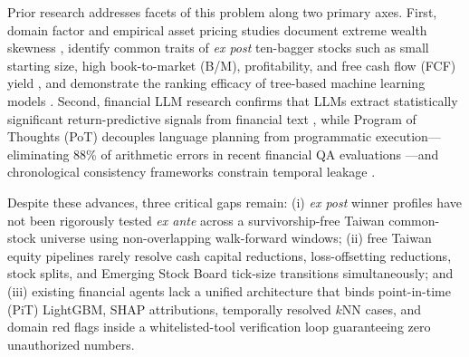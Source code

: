 \documentclass[conference]{IEEEtran}
\begin{document}
Prior research addresses facets of this problem along two primary axes. First, domain factor and empirical asset pricing studies document extreme wealth skewness \cite{bessembinder2023, bessembinder2026}, identify common traits of \emph{ex post} ten-bagger stocks such as small starting size, high book-to-market (B/M), profitability, and free cash flow (FCF) yield \cite{yartseva2025}, and demonstrate the ranking efficacy of tree-based machine learning models \cite{gu2020}. Second, financial LLM research confirms that LLMs extract statistically significant return-predictive signals from financial text \cite{lopezlira2026}, while Program of Thoughts (PoT) \cite{chen2023pot} decouples language planning from programmatic execution---eliminating 88\% of arithmetic errors in recent financial QA evaluations \cite{agenticrag2026}---and chronological consistency frameworks constrain temporal leakage \cite{he2025chrono}.

Despite these advances, three critical gaps remain: (i) \emph{ex post} winner profiles \cite{yartseva2025} have not been rigorously tested \emph{ex ante} across a survivorship-free Taiwan common-stock universe using non-overlapping walk-forward windows; (ii) free Taiwan equity pipelines rarely resolve cash capital reductions, loss-offsetting reductions, stock splits, and Emerging Stock Board tick-size transitions simultaneously; and (iii) existing financial agents lack a unified architecture that binds point-in-time (PiT) LightGBM, SHAP attributions, temporally resolved $k$NN cases, and domain red flags inside a whitelisted-tool verification loop guaranteeing zero unauthorized numbers.
\end{document}
